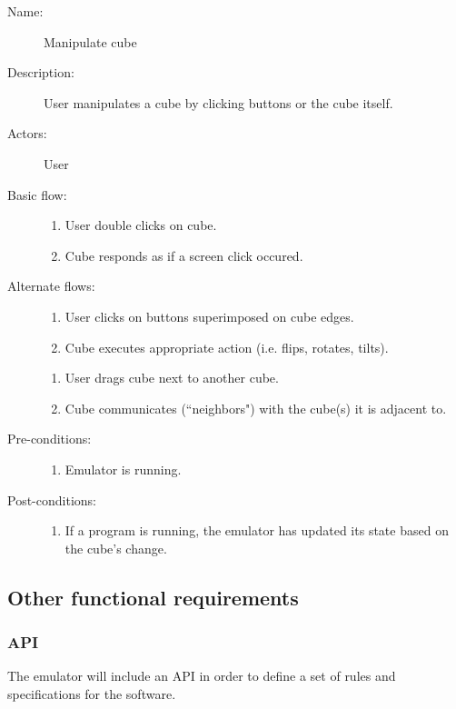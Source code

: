 \documentclass[12pt]{article}
\begin{document}
    \begin{description}
      \item[Name:] Manipulate cube
      \item[Description:] User manipulates a cube by clicking buttons or the cube itself.
      \item[Actors:] User
      \item[Basic flow:] \hfill
        \begin{enumerate}
	  \item{User double clicks on cube.}
	  \item{Cube responds as if a screen click occured.}
        \end{enumerate}
      \item[Alternate flows:] \hfill
        \begin{enumerate}
	  \item{User clicks on buttons superimposed on cube edges.}
	  \item{Cube executes appropriate action (i.e. flips, rotates, tilts).}
        \end{enumerate}
        \begin{enumerate}
          \item{User drags cube next to another cube.}
	  \item{Cube communicates (``neighbors") with the cube(s) it is adjacent to.}
        \end{enumerate}
      \item[Pre-conditions:] \hfill
        \begin{enumerate}
          \item{Emulator is running.}
        \end{enumerate}
      \item[Post-conditions:] \hfill
        \begin{enumerate}
	  \item{If a program is running, the emulator has updated its state based on the cube's change.}
        \end{enumerate}
    \end{description}
	
  \subsection{Other functional requirements}

	\subsubsection{API}
		The emulator will include an API in order to define a set of rules and specifications for the software.
	
\end{document}
